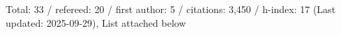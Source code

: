 Total: 33 / refereed: 20 / first author: 5 / citations: 3,450 / h-index: 17 (Last updated: 2025-09-29), List attached below